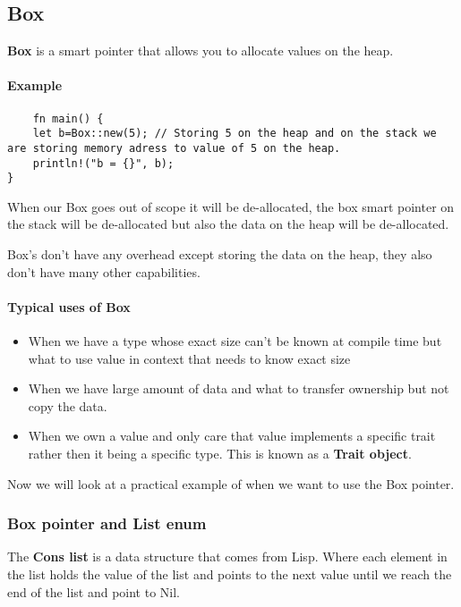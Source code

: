 \subsection{Box}
\begin{definition}
    \textbf{Box} is a smart pointer that allows you to allocate values on the heap.
\end{definition}

\paragraph*{Example}\begin{lstlisting}
    fn main() {
    let b=Box::new(5); // Storing 5 on the heap and on the stack we are storing memory adress to value of 5 on the heap.
    println!("b = {}", b);
}
\end{lstlisting}
When our Box goes out of scope it will be de-allocated, the box smart pointer on the stack will be de-allocated but also the data on the heap will be de-allocated.


Box's don't have any overhead except storing the data on the heap, they also don't have many other capabilities. 
\paragraph*{Typical uses of Box}
\begin{itemize}
    \item When we have a type whose exact size can't be known at compile time but what to use value in context that needs to know exact size
    \item When we have large amount of data and what to transfer ownership but not copy the data.
    \item When we own a value and only care that value implements a specific trait rather then it being a specific type. This is known as a \textbf{Trait object}.
\end{itemize}
Now we will look at a practical example of when we want to use the Box pointer.

\subsubsection{Box pointer and List enum}

\begin{definition}
    The \textbf{Cons list} is a data structure that comes from Lisp. Where each element in the list holds the value of the list and points to the next value until we reach the end of the list and point to Nil. 
\end{definition}


